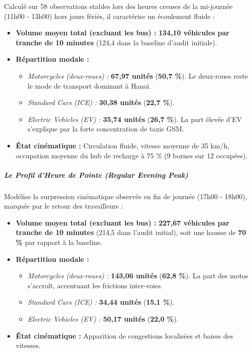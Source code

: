 \documentclass[10pt, a4paper]{article}
\providecommand{\tightlist}{}
\begin{document}
Calculé sur 58 observations stables lors des heures creuses de la
mi-journée (11h00 - 13h00) hors jours fériés, il caractérise un
écoulement fluide :

\begin{itemize}
\tightlist
\item
  \textbf{Volume moyen total (excluant les bus) :} \textbf{134,10
  véhicules par tranche de 10 minutes} (124,4 dans la baseline d'audit
  initiale).
\item
  \textbf{Répartition modale :}

  \begin{itemize}
  \tightlist
  \item
    \emph{Motorcycles (deux-roues) :} \textbf{67,97 unités}
    (\textbf{50,7 \%}). Le deux-roues reste le mode de transport
    dominant à Hanoï.
  \item
    \emph{Standard Cars (ICE) :} \textbf{30,38 unités} (\textbf{22,7
    \%}).
  \item
    \emph{Electric Vehicles (EV) :} \textbf{35,74 unités} (\textbf{26,7
    \%}). La part élevée d'EV s'explique par la forte concentration de
    taxis GSM.
  \end{itemize}
\item
  \textbf{État cinématique :} Circulation fluide, vitesse moyenne de 35
  km/h, occupation moyenne du hub de recharge à 75 \% (9 bornes sur 12
  occupées).
\end{itemize}

\subparagraph{Le Profil d'Heure de Pointe (Regular Evening
Peak)}\label{le-profil-dheure-de-pointe-regular-evening-peak}

Modélise la surpression cinématique observée en fin de journée (17h00 -
18h00), marquée par le retour des travailleurs :

\begin{itemize}
\tightlist
\item
  \textbf{Volume moyen total (excluant les bus) :} \textbf{227,67
  véhicules par tranche de 10 minutes} (214,5 dans l'audit initial),
  soit une hausse de \textbf{70 \%} par rapport à la baseline.
\item
  \textbf{Répartition modale :}

  \begin{itemize}
  \tightlist
  \item
    \emph{Motorcycles (deux-roues) :} \textbf{143,06 unités}
    (\textbf{62,8 \%}). La part des motos s'accroît, accentuant les
    frictions inter-voies.
  \item
    \emph{Standard Cars (ICE) :} \textbf{34,44 unités} (\textbf{15,1
    \%}).
  \item
    \emph{Electric Vehicles (EV) :} \textbf{50,17 unités} (\textbf{22,0
    \%}).
  \end{itemize}
\item
  \textbf{État cinématique :} Apparition de congestions localisées et
  baisse des vitesses.
\end{itemize}
\end{document}
